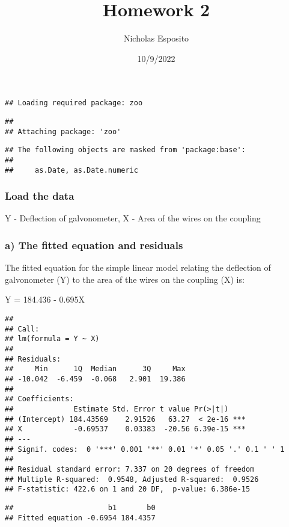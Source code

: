 \documentclass[
]{article}
\title{Homework 2}
\author{Nicholas Esposito}
\date{10/9/2022}
\begin{document}
\maketitle

\begin{verbatim}
## Loading required package: zoo
\end{verbatim}

\begin{verbatim}
## 
## Attaching package: 'zoo'
\end{verbatim}

\begin{verbatim}
## The following objects are masked from 'package:base':
## 
##     as.Date, as.Date.numeric
\end{verbatim}

\hypertarget{load-the-data}{%
\subsubsection{Load the data}\label{load-the-data}}

Y - Deflection of galvonometer, X - Area of the wires on the coupling

\hypertarget{a-the-fitted-equation-and-residuals}{%
\subsubsection{a) The fitted equation and
residuals}\label{a-the-fitted-equation-and-residuals}}

The fitted equation for the simple linear model relating the deflection
of galvonometer (Y) to the area of the wires on the coupling (X) is:

Y = 184.436 - 0.695X

\begin{verbatim}
## 
## Call:
## lm(formula = Y ~ X)
## 
## Residuals:
##     Min      1Q  Median      3Q     Max 
## -10.042  -6.459  -0.068   2.901  19.386 
## 
## Coefficients:
##              Estimate Std. Error t value Pr(>|t|)    
## (Intercept) 184.43569    2.91526   63.27  < 2e-16 ***
## X            -0.69537    0.03383  -20.56 6.39e-15 ***
## ---
## Signif. codes:  0 '***' 0.001 '**' 0.01 '*' 0.05 '.' 0.1 ' ' 1
## 
## Residual standard error: 7.337 on 20 degrees of freedom
## Multiple R-squared:  0.9548, Adjusted R-squared:  0.9526 
## F-statistic: 422.6 on 1 and 20 DF,  p-value: 6.386e-15
\end{verbatim}

\begin{verbatim}
##                      b1       b0
## Fitted equation -0.6954 184.4357
\end{verbatim}
\end{document}
